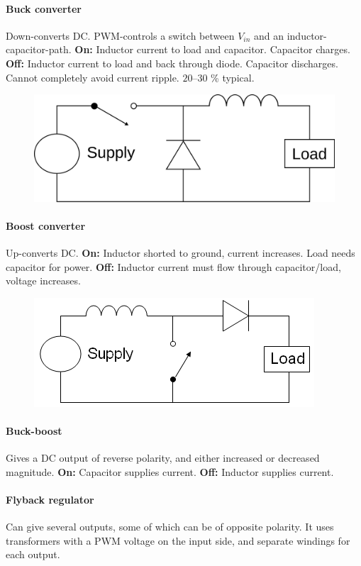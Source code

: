 \documentclass[a4paper, 12pt]{article}
\begin{document}
\paragraph{Buck converter} Down-converts DC. PWM-controls a switch between $V_{in}$ and an inductor-capacitor-path. \textbf{On:} Inductor current to load and capacitor. Capacitor charges. \textbf{Off:} Inductor current to load and back through diode. Capacitor discharges. Cannot completely avoid current ripple. $20$--$30$ \% typical.
\begin{figure}[H]
\centering
\includegraphics[width=0.5\linewidth]{buck}
\end{figure}

\paragraph{Boost converter} Up-converts DC. \textbf{On:} Inductor shorted to ground, current increases. Load needs capacitor for power. \textbf{Off:} Inductor current must flow through capacitor/load, voltage increases.
\begin{figure}[H]
\centering
\includegraphics[width=0.5\linewidth]{boost}
\end{figure}

\paragraph{Buck-boost} Gives a DC output of reverse polarity, and either increased or decreased magnitude. \textbf{On:} Capacitor supplies current. \textbf{Off:} Inductor supplies current.

\paragraph{Flyback regulator} Can give several outputs, some of which can be of opposite polarity. It uses transformers with a PWM voltage on the input side, and separate windings for each output.
\end{document}
